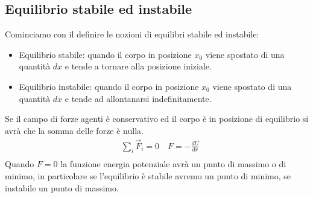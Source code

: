 \documentclass[10pt,a4paper]{article}
\begin{document}
\subsection{Equilibrio stabile ed instabile}
Cominciamo con il definire le nozioni di equilibri stabile ed instabile:\\
\begin{itemize}
\item Equilibrio stabile: quando il corpo in posizione $x_0$ viene spostato di una quantità $dx$ e tende a tornare alla posizione iniziale.
\item Equilibrio instabile: quando il corpo in posizione $x_0$ viene spostato di una quantità $dx$ e tende ad allontanarsi indefinitamente.
\end{itemize}
Se il campo di forze agenti è conservativo ed il corpo è in posizione di equilibrio si avrà che la somma delle forze è nulla. 
\begin{align*}
	&\sum_i \vec{F}_i = 0 \quad F = -\frac{dU}{dr}\\
\end{align*}
Quando $F = 0$ la funzione energia potenziale avrà un punto di massimo o di minimo, in particolare se l'equilibrio è stabile avremo un punto di minimo, se instabile un punto di massimo. 
\end{document}
